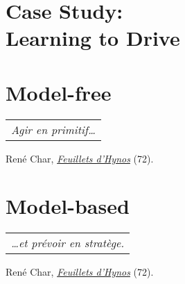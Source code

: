 \setcounter{mtc}{-1}
\adjustmtc




\part[Case Study: Learning to Drive]{Case Study:\\Learning to Drive}
\label{part:1}




\part{Model-free}
\label{part:2}

\vspace*{2cm}
\begin{flushright}
	\begin{tabular}{@{}l@{}}
		\emph{Agir en primitif\dots}\\
	\end{tabular}
	
	René Char, \href{https://eleurent.github.io/sisyphe/texts/feuillets-d-hypnos.html}{\emph{Feuillets d'Hynos}} {\small (72)}.
\end{flushright}




\part{Model-based}
\label{part:3}

\vspace*{2cm}
\begin{flushright}
	\begin{tabular}{@{}l@{}}
		\emph{\dots et prévoir en stratège.}\\
	\end{tabular}
	
	René Char, \href{https://eleurent.github.io/sisyphe/texts/feuillets-d-hypnos.html}{\emph{Feuillets d'Hynos}} {\small (72)}.
\end{flushright}




